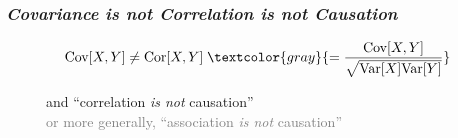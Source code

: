 \documentclass[xcolor={dvipsnames}]{beamer}
\begin{document}
 

\frame
{
 \frametitle{\emph{Covariance is not Correlation is not Causation}}

$$\text{Cov}[X,Y] \not = \text{Cor}[X,Y] \; \textcolor{gray}{= \frac{\text{Cov}[X,Y]}{\sqrt{\text{Var}[X]\text{Var}[Y] }}}$$



\begin{figure}[h!]
   \centering
   
and ``correlation \emph{is not} causation''\\
\textcolor{gray}{or more generally, ``association \emph{is not} causation''}\\${}$


\scriptsize
{}
\end{figure}  



}
\end{document}
